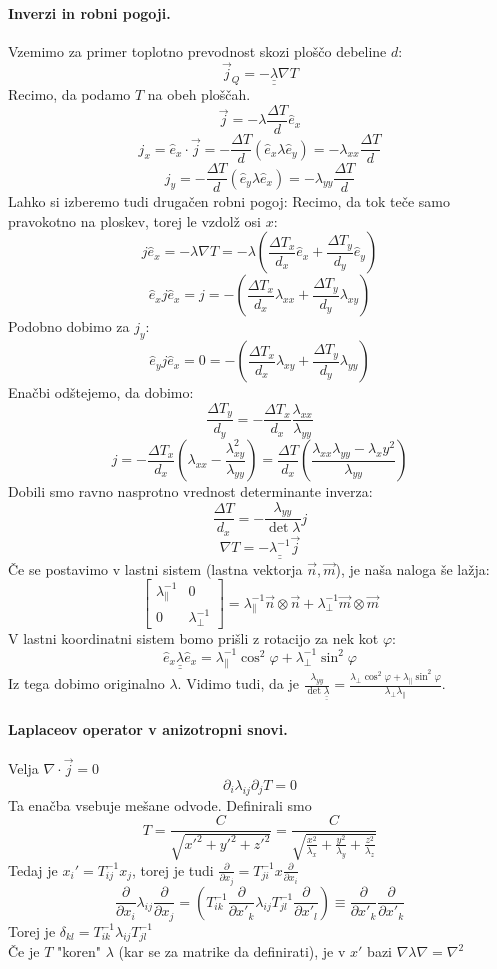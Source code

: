 \documentclass[a4paper]{article}
\newcommand{\vct}[1]{\overrightarrow{#1}}
\newcommand{\pd}[2]{\frac{\partial {#1}}{\partial {#2}}}
\newcommand{\dunderline}[1]{\underline{\underline{#1}}}
\begin{document}
\paragraph{Inverzi in robni pogoji.} Vzemimo za primer toplotno prevodnost skozi ploščo debeline $d$:
$$\vct{j}_Q = - \dunderline{\lambda} \nabla T$$
Recimo, da podamo $T$ na obeh ploščah.
$$\vct{j} = -\lambda\frac{\Delta T}{d}\hat{e}_x$$
$$j_x = \hat{e}_x\cdot\vct{j} = -\frac{\Delta T}{d}\left(\hat{e}_x\lambda\hat{e}_y\right) = -\lambda_{xx}\frac{\Delta T}{d}$$
$$j_y = -\frac{\Delta T}{d}\left(\hat{e}_y\lambda\hat{e}_x\right) = -\lambda_{yy}\frac{\Delta T}{d}$$
Lahko si izberemo tudi drugačen robni pogoj: Recimo, da tok teče samo pravokotno na ploskev, torej le vzdolž osi $x$:
$$j\hat{e}_x = -\lambda\nabla T = -\lambda\left(\frac{\Delta T_x}{d_x} \hat{e}_x + \frac{\Delta T_y}{d_y}\hat{e}_y\right)$$
$$\hat{e}_xj\hat{e}_x = j = -\left(\frac{\Delta T_x}{d_x} \lambda_{xx} + \frac{\Delta T_y}{d_y} \lambda_{xy}\right)$$
Podobno dobimo za $j_y$:
$$\hat{e}_yj\hat{e}_x = 0 = -\left(\frac{\Delta T_x}{d_x}\lambda_{xy} + \frac{\Delta T_y}{d_y}\lambda_{yy}\right)$$
Enačbi odštejemo, da dobimo:
$$\frac{\Delta T_y}{d_y} =- \frac{\Delta T_x}{d_x}\frac{\lambda_{xx}}{\lambda_{yy}}$$
$$j = -\frac{\Delta T_{x}}{d_x}\left(\lambda_{xx} - \frac{\lambda_{xy}^2}{\lambda_{yy}}\right) = \frac{\Delta T}{d_x} \left(\frac{\lambda_{xx}\lambda_{yy} - \lambda_xy^2}{\lambda_{yy}}\right)$$
Dobili smo ravno nasprotno vrednost determinante inverza:
$$\frac{\Delta T}{d_x} = -\frac{\lambda_{yy}}{\det \lambda}j$$
$$\nabla T = -\dunderline{\lambda^{-1}}\vct{j}$$
Če se postavimo v lastni sistem (lastna vektorja $\vct{n}, \vct{m}$), je naša naloga še lažja:
$$\begin{bmatrix}
    \lambda_\parallel^{-1} & 0 \\
    0 & \lambda_\perp^{-1}
\end{bmatrix} = \lambda_\parallel^{-1} \vct{n}\otimes\vct{n} + \lambda_{\perp}^{-1} \vct{m}\otimes\vct{m}$$
V lastni koordinatni sistem bomo prišli z rotacijo za nek kot $\varphi$:
$$\hat{e}_x \dunderline{\lambda}\hat{e}_x = \lambda_\parallel^{-1}\cos^2\varphi + \lambda_\perp^{-1}\sin^2\varphi$$
Iz tega dobimo originalno $\lambda$. Vidimo tudi, da je $\displaystyle{\frac{\lambda_{yy}}{\det\dunderline{\lambda}} = \frac{\lambda_\perp\cos^2\varphi + \lambda_\parallel\sin^2\varphi}{\lambda_\perp\lambda_\parallel}}$.
\paragraph{Laplaceov operator v anizotropni snovi.} Velja $\nabla\cdot\vct{j}=0$
$$\partial_i\lambda_{ij}\partial_jT=0$$
Ta enačba vsebuje mešane odvode. Definirali smo
$$T = \frac{C}{\sqrt{x'^2 + y'^2 + z'^2}} = \frac{C}{\sqrt{\frac{x^2}{\lambda_x} + \frac{y^2}{\lambda_y} + \frac{z^2}{\lambda_z}}}$$
Tedaj je $x_i' = T_{ij}^{-1}x_j$, torej je tudi $\displaystyle{\pd{}{x_j} = T_{ji}^{-1}x\pd{}{x_i}}$
$$\pd{}{x_i}\lambda_{ij}\pd{}{x_j} = \left(T_{ik}^{-1} \pd{}{x'_k}\lambda_{ij}T_{jl}^{-1}\pd{}{x'_l}\right) \equiv \pd{}{x'_k}\pd{}{x'_k}$$
Torej je $\displaystyle{\delta_{kl} = T^{-1}_{ik}\lambda_{ij}T^{-1}_{jl}}$ \\
Če je $T$ "koren" $\lambda$ (kar se za matrike da definirati), je v $x'$ bazi $\nabla\lambda\nabla = \nabla^2$
\end{document}
